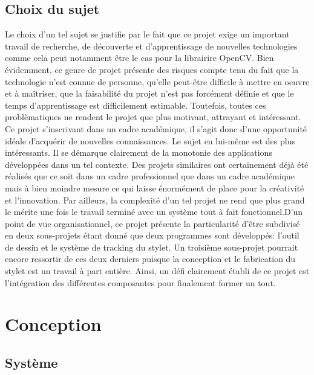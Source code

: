 \documentclass[11pt,a4paper,oldfontcommands]{memoir}
\begin{document}
\section{Choix du sujet}

Le choix d'un tel sujet se justifie par le fait que ce projet exige un important travail de recherche, de découverte et d'apprentissage de nouvelles technologies comme cela peut notamment être le cas pour la librairire OpenCV. Bien évidemment, ce genre de projet présente des risques compte tenu du fait que la technologie n'est connue de personne, qu'elle peut-être difficile à mettre en oeuvre et à maîtriser, que la faisabilité du projet n'est pas forcément définie et que le temps d'apprentissage est difficilement estimable. Toutefois, toutes ces problèmatiques ne rendent le projet que plus motivant, attrayant et intéressant. Ce projet s'inscrivant dans un cadre académique, il s'agit donc d'une opportunité idéale d'acquérir de nouvelles connaissances. Le sujet en lui-même est des plus intéressants. Il se démarque clairement de la monotonie des applications développées dans un tel contexte. Des projets similaires ont certainement déjà été réalisés que ce soit dans un cadre professionnel que dans un cadre académique mais à bien moindre mesure ce qui laisse énormément de place pour la créativité et l'innovation. Par ailleurs, la complexité d'un tel projet ne rend que plus grand le mérite une fois le travail terminé avec un système tout à fait fonctionnel.D'un point de vue organisationnel, ce projet présente la particularité d'être subdivisé en deux sous-projets étant donné que deux programmes sont développés: l'outil de dessin et le système de tracking du stylet. Un troisième sous-projet pourrait encore ressortir de ces deux derniers puisque la conception et le fabrication du stylet est un travail à part entière. Ainsi, un défi clairement établi de ce projet est l'intégration des différentes composantes pour finalement former un tout.


\chapter{Conception}
\label{ch:conception}

\section{Système}
\end{document}
